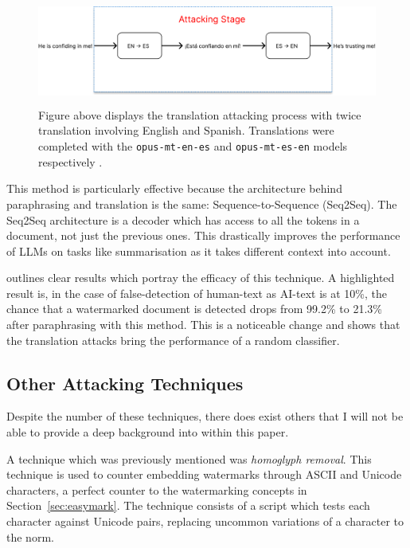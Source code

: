\documentclass{l4proj}
\theoremstyle{definition}
\begin{document}
        \begin{figure}[ht]
            \centering
            \includegraphics[height=3.5cm, width=1\linewidth, keepaspectratio]{images/background/translation-removal-process.pdf}
            \caption{Figure above displays the translation attacking process with twice translation involving English and Spanish. Translations were completed with the \texttt{opus-mt-en-es} and \texttt{opus-mt-es-en} models respectively \citep{TiedemannThottingal:EAMT2020}.}
            \label{fig:translation-removal-process}
        \end{figure}
        
        This method is particularly effective because the architecture behind paraphrasing and translation is the same: Sequence-to-Sequence (Seq2Seq). The Seq2Seq architecture is a decoder which has access to all the tokens in a document, not just the previous ones. This drastically improves the performance of LLMs on tasks like summarisation as it takes different context into account. 

        \citet{he2024watermarks} outlines clear results which portray the efficacy of this technique. A highlighted result is, in the case of false-detection of human-text as AI-text is at 10\%, the chance that a watermarked document is detected drops from 99.2\% to 21.3\% after paraphrasing with this method. This is a noticeable change and shows that the translation attacks bring the performance of a random classifier. 

    \subsection{Other Attacking Techniques}
        Despite the number of these techniques, there does exist others that I will not be able to provide a deep background into within this paper.

        A technique which was previously mentioned was \emph{homoglyph removal}. This technique is used to counter embedding watermarks through ASCII and Unicode characters, a perfect counter to the watermarking concepts in Section~\ref{sec:easymark}. The technique consists of a script which tests each character against Unicode pairs, replacing uncommon variations of a character to the norm. 
\end{document}
